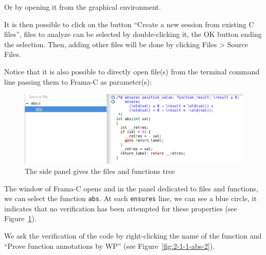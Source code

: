 \documentclass[12pt,francais,]{scrbook}
\newenvironment{Shaded}{}{}
\newcommand{\KeywordTok}[1]{\textcolor[rgb]{0.00,0.44,0.13}{\textbf{{#1}}}}
\newcommand{\NormalTok}[1]{{#1}}
\begin{document}
\begin{footnotesize}\begin{Shaded}
\end{Shaded}\end{footnotesize}

Or by opening it from the graphical environment.

It is then possible to click on the button ``Create a new session from
existing C files'', files to analyze can be selected by double-clicking
it, the OK button ending the selection. Then, adding other files will be
done by clicking Files \textgreater{} Source Files.

Notice that it is also possible to directly open file(s) from the
terminal command line passing them to Frama-C as parameter(s):

\begin{footnotesize}\begin{Shaded}
\end{Shaded}\end{footnotesize}

\begin{figure}[htbp]
\centering
\includegraphics[scale=0.5]{2-1-1-abs-1.png}
\caption{The side panel gives the files and functions tree}
\label{fig:2-1-1-abs-1}
\end{figure}

The window of Frama-C opens and in the panel dedicated to files and
functions, we can select the function \texttt{abs}. At each
\texttt{ensures} line, we can see a blue circle, it indicates that no
verification has been attempted for these properties
(see Figure~\ref{fig:2-1-1-abs-1}).

We ask the verification of the code by right-clicking the name of the
function and ``Prove function annotations by WP''
(see Figure~\ref{fig:2-1-1-abs-2}).
\end{document}
